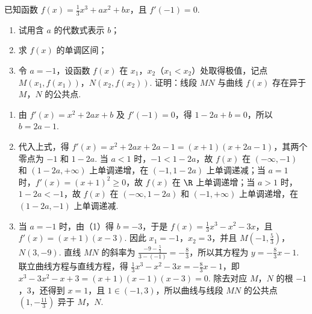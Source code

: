 \begin{problem}
已知函数 \( f(x) = \frac{1}{3} x^3 + ax^2 + bx \)，且 \( f'(-1) = 0 \).

\begin{enumerate}
\item 试用含 \(a\) 的代数式表示 \(b\)；
\item 求 \( f(x) \) 的单调区间；
\item 令 \(a = -1\)，设函数 \(f(x)\) 在 \(x_{1}\)，\(x_{2}\)（\(x_{1} < x_{2}\)）处取得极值，记点 \(M(x_{1}, f(x_{1}))\)，\(N(x_{2}, f(x_{2}))\). 证明：线段 \(MN\) 与曲线 \(f(x)\) 存在异于 \(M\)，\(N\) 的公共点.
\end{enumerate}

\end{problem}

\begin{solution}
\begin{enumerate}
\item 由 \(f'(x)=x^2+2ax+b\) 及 \(f'(-1)=0\)，得 \(1-2a+b=0\)，所以 \(b=2a-1\).
\item 代入上式，得 \(f'(x)=x^2+2ax+2a-1=(x+1)(x+2a-1)\)，其两个零点为 \(-1\) 和 \(1-2a\). 当 \(a<1\) 时，\(-1<1-2a\)，故 \(f(x)\) 在 \((-\infty,-1)\) 和 \((1-2a,+\infty)\) 上单调递增，在 \((-1,1-2a)\) 上单调递减；当 \(a=1\) 时，\(f'(x)=(x+1)^2\geqslant0\)，故 \(f(x)\) 在 \(\R\) 上单调递增；当 \(a>1\) 时，\(1-2a<-1\)，故 \(f(x)\) 在 \((-\infty,1-2a)\) 和 \((-1,+\infty)\) 上单调递增，在 \((1-2a,-1)\) 上单调递减.
\item 当 \(a=-1\) 时，由（1）得 \(b=-3\)，于是 \(f(x)=\frac{1}{3}x^3-x^2-3x\)，且 \(f'(x)=(x+1)(x-3)\). 因此 \(x_1=-1\)，\(x_2=3\)，并且 \(M\left(-1,\frac{5}{3}\right)\)，\(N(3,-9)\). 直线 \(MN\) 的斜率为 \(\frac{-9-\frac{5}{3}}{3-(-1)}=-\frac{8}{3}\)，所以其方程为 \(y=-\frac{8}{3}x-1\). 联立曲线方程与直线方程，得 \(\frac{1}{3}x^3-x^2-3x=-\frac{8}{3}x-1\)，即 \(x^3-3x^2-x+3=(x+1)(x-1)(x-3)=0\). 除去对应 \(M\)，\(N\) 的根 \(-1\)，\(3\)，还得到 \(x=1\)，且 \(1\in(-1,3)\)，所以曲线与线段 \(MN\) 的公共点 \(\left(1,-\frac{11}{3}\right)\) 异于 \(M\)，\(N\).
\end{enumerate}
\end{solution}

